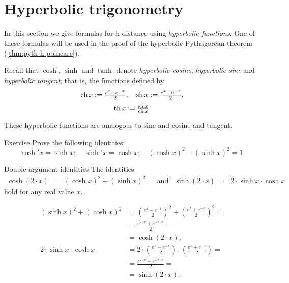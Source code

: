 \section*{Hyperbolic trigonometry}

In this section we give formulas for h-distance using \emph{hyperbolic functions}.
One of these formulas will be used in the proof of the hyperbolic Pythagorean theorem (\ref{thm:pyth-h-poincare}).

Recall that $\cosh$, $\sinh$ and $\tanh$ denote \emph{hyperbolic cosine}, \emph{hyperbolic sine} and \emph{hyperbolic tangent};
that is, the functions defined by
\[\operatorname{ch} x:= \tfrac{e^x+e^{-x}}2,
 \quad
 \operatorname{sh} x:= \tfrac{e^x-e^{-x}}2,
\]
\[\operatorname{th} x:= \tfrac{\operatorname{sh} x}{\operatorname{ch} x}.
\]

These hyperbolic functions are analogous to sine and cosine and tangent. 

\begin{thm}{Exercise}\label{ex:hyp-fun}
Prove the following identities:
\[\cosh' x=\sinh x;\quad \sinh'x=\cosh x;\quad (\cosh x)^2-(\sinh x)^2=1.\]
\end{thm}

\begin{thm}{Double-argument identities}\label{double-argument}
The identities
\begin{align*}
\cosh (2\cdot x)&=(\cosh x)^2+(\sinh x)^2 
&&\text{and}&
\sinh (2\cdot x)&=2\cdot\sinh x\cdot \cosh x
\end{align*}
hold for any real value $x$.
\end{thm}

\begin{align*}
(\sinh x)^2+(\cosh x)^2
&=(\tfrac{e^x-e^{-x}}2)^2+(\tfrac{e^x+e^{-x}}2)^2=
\\
&=\tfrac{e^{2\cdot x}+e^{-2\cdot x}}2=
\\
&=\cosh (2\cdot x);
\\
2\cdot\sinh x\cdot \cosh x
&=2\cdot(\tfrac{e^x-e^{-x}}2)\cdot(\tfrac{e^x+e^{-x}}2)=
\\
&=\tfrac{e^{2\cdot x}-e^{-2\cdot x}}2=
\\
&=\sinh (2\cdot x).
\end{align*}
\qedsf

